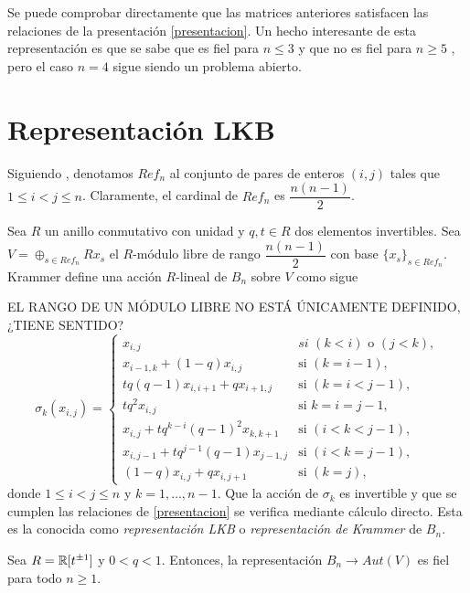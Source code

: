 \documentclass[TFG.tex]{subfiles}
\begin{document}
Se puede comprobar directamente que las matrices anteriores satisfacen las relaciones de la presentación \ref{presentacion}. Un hecho interesante de esta representación es que se sabe que es fiel para $n\leq 3$ \cite{Birman} y que no es fiel para $n\geq 5$ \cite{Bil}\cite{LP}, pero el caso $n=4$ sigue siendo un problema abierto.

\section{Representación LKB}
Siguiendo \cite{Krammer}, denotamos $Ref_n$ al conjunto de pares de enteros $(i,j)$ tales que $1\leq i<j\leq n$. Claramente, el cardinal de $Ref_n$ es $\dfrac{n(n-1)}{2}$.

Sea $R$ un anillo conmutativo con unidad y $q,t\in R$ dos elementos invertibles. Sea $V=\oplus_{s\in Ref_n}Rx_s$ el $R$-módulo libre de rango $\dfrac{n(n-1)}{2}$ con base $\{x_s\}_{s\in Ref_n}$. Krammer \cite{Krammer} define una acción $R$-lineal de $B_n$ sobre $V$ como sigue


EL RANGO DE UN MÓDULO LIBRE NO ESTÁ ÚNICAMENTE DEFINIDO, ¿TIENE SENTIDO?
\begin{equation}\label{LKB}
\sigma_k(x_{i,j})=\begin{cases}
x_{i,j} & \textit{si }(k<i)\text{ o }(j<k),\\
x_{i-1,k}+(1-q)x_{i,j} & \text{si } (k=i-1),\\
tq(q-1)x_{i,i+1}+qx_{i+1,j} & \text{si }(k=i<j-1),\\
tq^2x_{i,j} & \text{si }k=i=j-1,\\
x_{i,j}+tq^{k-i}(q-1)^2x_{k,k+1} & \text{si }(i<k<j-1),\\
x_{i,j-1}+tq^{j-1}(q-1)x_{j-1,j} & \text{si }(i<k=j-1),\\
(1-q)x_{i,j}+qx_{i,j+1} & \text{si }(k=j),
\end{cases}
\end{equation}
donde $1\leq i<j\leq n$ y $k=1,\dots, n-1$. Que la acción de $\sigma_k$ es invertible y que se cumplen las relaciones de \ref{presentacion} se verifica mediante cálculo directo. Esta es la conocida como \emph{representación LKB} o \emph{representación de Krammer} de $B_n$.


\begin{teorema}
Sea $R=\mathbb{R}[t^{\pm 1}]$ y $0<q<1$. Entonces, la representación $B_n\to Aut(V)$ es fiel para todo $n\geq 1$.
\end{teorema}
\end{document}
